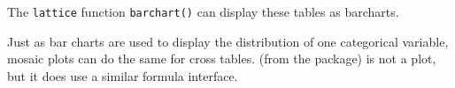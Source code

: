 The \verb!lattice! function \verb!barchart()! can display these tables as barcharts.
\begin{knitrout}
\end{knitrout}

\begin{knitrout}
\end{knitrout}



Just as bar charts are used to display the distribution
of one categorical variable,  mosaic plots can do the same for cross tables.
 (from the  package) is not a  plot, 
but it does use a similar formula interface.  

